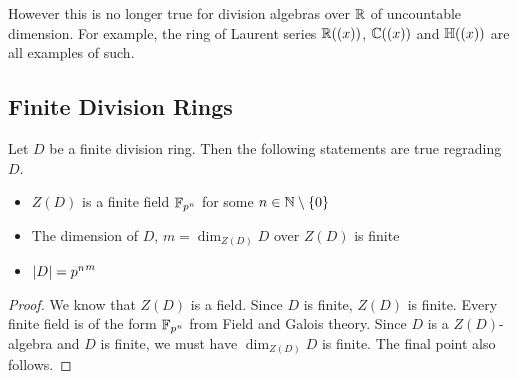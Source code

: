 \documentclass[a4paper]{article}
\begin{document}
However this is no longer true for division algebras over $\mathbb{R}$ of uncountable dimension. For example, the ring of Laurent series $\mathbb{R}((x))$, $\mathbb{C}((x))$ and $\mathbb{H}((x))$ are all examples of such. 

\subsection{Finite Division Rings}
\begin{crl}{}{} Let $D$ be a finite division ring. Then the following statements are true regrading $D$. 
\begin{itemize}
\item $Z(D)$ is a finite field $\mathbb{F}_{p^n}$ for some $n\in\mathbb{N}\setminus\{0\}$
\item The dimension of $D$, $m=\dim_{Z(D)}D$ over $Z(D)$ is finite
\item $\abs{D}={p^n}^m$
\end{itemize} \tcbline
\begin{proof}
We know that $Z(D)$ is a field. Since $D$ is finite, $Z(D)$ is finite. Every finite field is of the form $\mathbb{F}_{p^n}$ from Field and Galois theory. Since $D$ is a $Z(D)$-algebra and $D$ is finite, we must have $\dim_{Z(D)}D$ is finite. The final point also follows. 
\end{proof}
\end{crl}
\end{document}
